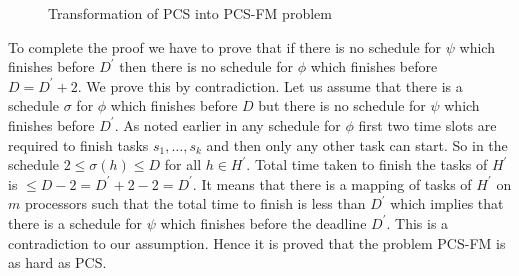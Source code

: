 \documentclass[journal]{IEEEtran}
\begin{document}
\begin{figure}[tbp]
  \centering
{}
 \caption{Transformation of PCS into PCS-FM problem}
  \label{fig:scheduling}
\end{figure}


To complete the proof we have to prove that if there is no schedule
for $\psi$ which finishes before $D^{\prime}$ then there is no
schedule for $\phi$ which finishes before $D =D^{\prime}+2.$ We prove
this by contradiction. Let us assume that there is a schedule $\sigma$
for $\phi$ which finishes before $D$ but there is no schedule for
$\psi$ which finishes before $D^{\prime}.$ As noted earlier in any
schedule for $\phi$ first two time slots are required to finish tasks
$s_1,\ldots,s_k$ and then only any other task can start. So in the
schedule $ 2 \leq \sigma(h) \leq D$ for all $h \in H^{\prime}.$ Total
time taken to finish the tasks of $H^{\prime}$ is $ \leq D-2 =
D^{\prime} +2 -2 = D^{\prime}.$ It means that there is a mapping of
tasks of $H^{\prime}$ on $m$ processors such that the total time to
finish is less than $D^{\prime}$ which implies that there is a
schedule for $\psi$ which finishes before the deadline $D^{\prime}.$
This is a contradiction to our assumption. Hence it is proved that the
problem PCS-FM is as hard as PCS.
\end{document}
